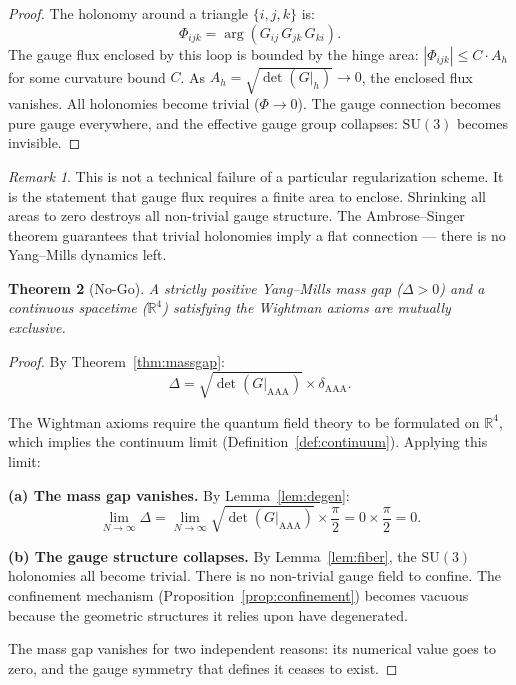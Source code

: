 \documentclass[12pt]{article}
\newtheorem{theorem}{Theorem}[section]
\theoremstyle{remark}
\newtheorem{remark}[theorem]{Remark}
\begin{document}
\begin{proof}
The holonomy around a triangle $\{i, j, k\}$ is:
\begin{equation}
\Phi_{ijk} = \arg(G_{ij}\, G_{jk}\, G_{ki}).
\end{equation}
The gauge flux enclosed by this loop is bounded by the hinge area:
$|\Phi_{ijk}| \leq C \cdot A_h$ for some curvature bound $C$.
As $A_h = \sqrt{\det(G|_h)} \to 0$, the enclosed flux vanishes.
All holonomies become trivial ($\Phi \to 0$). The gauge connection
becomes pure gauge everywhere, and the effective gauge group collapses:
$\mathrm{SU}(3)$ becomes invisible.
\end{proof}

\begin{remark}
This is not a technical failure of a particular regularization scheme.
It is the statement that gauge flux requires a finite area to enclose.
Shrinking all areas to zero destroys all non-trivial gauge structure.
The Ambrose--Singer theorem \cite{Ambrose-Singer} guarantees that
trivial holonomies imply a flat connection --- there is no Yang--Mills
dynamics left.
\end{remark}

\begin{theorem}[No-Go]
\label{thm:nogo}
A strictly positive Yang--Mills mass gap ($\Delta > 0$) and a continuous
spacetime ($\mathbb{R}^4$) satisfying the Wightman axioms are mutually
exclusive.
\end{theorem}

\begin{proof}
By Theorem~\ref{thm:massgap}:
\begin{equation}
\Delta = \sqrt{\det(G|_{\mathrm{AAA}})} \times \delta_{\mathrm{AAA}}.
\end{equation}

The Wightman axioms require the quantum field theory to be formulated on
$\mathbb{R}^4$, which implies the continuum limit
(Definition~\ref{def:continuum}). Applying this limit:

\medskip\noindent
\textbf{(a) The mass gap vanishes.}
By Lemma~\ref{lem:degen}:
\begin{equation}
\lim_{N \to \infty} \Delta
= \lim_{N \to \infty} \sqrt{\det(G|_{\mathrm{AAA}})}
  \times \frac{\pi}{2}
= 0 \times \frac{\pi}{2} = 0.
\end{equation}

\textbf{(b) The gauge structure collapses.}
By Lemma~\ref{lem:fiber}, the $\mathrm{SU}(3)$ holonomies all become
trivial. There is no non-trivial gauge field to confine. The confinement
mechanism (Proposition~\ref{prop:confinement}) becomes vacuous because
the geometric structures it relies upon have degenerated.

\medskip\noindent
The mass gap vanishes for two independent reasons: its numerical value
goes to zero, and the gauge symmetry that defines it ceases to exist.
\end{proof}
\end{document}
